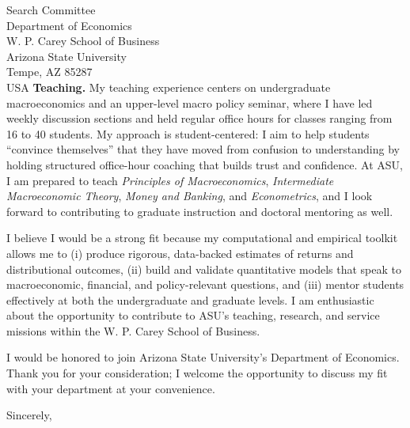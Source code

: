\documentclass[11pt,letterpaper]{letter}
\begin{document}
\begin{letter}{Search Committee \\
Department of Economics \\
W. P. Carey School of Business \\
Arizona State University \\
Tempe, AZ 85287 \\ USA}
\textbf{Teaching.} My teaching experience centers on undergraduate macroeconomics and an upper-level macro policy seminar, where I have led weekly discussion sections and held regular office hours for classes ranging from 16 to 40 students. My approach is student-centered: I aim to help students “convince themselves” that they have moved from confusion to understanding by holding structured office-hour coaching that builds trust and confidence. At ASU, I am prepared to teach \textit{Principles of Macroeconomics}, \textit{Intermediate Macroeconomic Theory}, \textit{Money and Banking}, and \textit{Econometrics}, and I look forward to contributing to graduate instruction and doctoral mentoring as well.

I believe I would be a strong fit because my computational and empirical toolkit allows me to (i) produce rigorous, data-backed estimates of returns and distributional outcomes, (ii) build and validate quantitative models that speak to macroeconomic, financial, and policy-relevant questions, and (iii) mentor students effectively at both the undergraduate and graduate levels. I am enthusiastic about the opportunity to contribute to ASU’s teaching, research, and service missions within the W. P. Carey School of Business.

I would be honored to join Arizona State University’s Department of Economics. Thank you for your consideration; I welcome the opportunity to discuss my fit with your department at your convenience.

\closing{Sincerely,}

\end{letter}
\end{document}
